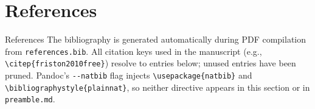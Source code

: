 \documentclass[
  ignorenonframetext,
]{beamer}
\author{\texorpdfstring{}{}}
\date{}
\begin{document}
\section{References}\label{references}

\begin{frame}{References}
The bibliography is generated automatically during PDF compilation from
\texttt{references.bib}. All citation keys used in the manuscript (e.g.,
\texttt{\textbackslash{}citep\{friston2010free\}}) resolve to entries
below; unused entries have been pruned. Pandoc's \texttt{-\/-natbib}
flag injects \texttt{\textbackslash{}usepackage\{natbib\}} and
\texttt{\textbackslash{}bibliographystyle\{plainnat\}}, so neither
directive appears in this section or in \texttt{preamble.md}.


\end{frame}
\end{document}
